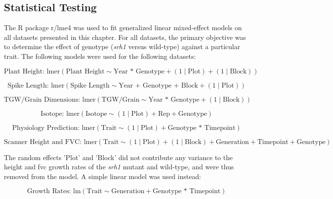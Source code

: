 \documentclass{article}
\begin{document}
\subsection{Statistical Testing}
The R package r/lme4 was used to fit generalized linear mixed-effect models
on all datasets presented in this chapter. For all datasets, the primary
objective was to determine the effect of genotype (\textit{srh1} versus wild-type)
against a particular trait. The following models were used for the following
datasets:

\begin{equation}
	\text{Plant Height: }\text{lmer}\left( \text{Plant Height}\sim \text{Year
		* Genotype}+ (1 \mid \text{Plot}) + (1 \mid \text{Block})\right)
\end{equation}

\begin{equation}
	\text{Spike Length: }\text{lmer}\left( \text{Spike Length}\sim \text{Year
		+ Genotype + Block}+ (1 \mid \text{Plot})\right)
\end{equation}

\begin{equation}
	\text{TGW/Grain Dimensions: }\text{lmer}\left( \text{TGW/Grain}\sim \text{Year
		* Genotype}+ (1 \mid \text{Block})\right)
\end{equation}

\begin{equation}
	\text{Isotope: }\text{lmer}\left( \text{Isotope}\sim (1 \mid \text{Plot})
	+ \text{Rep}+ \text{Genotype}\right)
\end{equation}

\begin{equation}
	\text{Physiology Prediction: }\text{lmer}\left( \text{Trait}\sim (1 \mid
		\text{Plot}) + \text{Genotype * Timepoint}\right)
\end{equation}

\begin{equation}
	\text{Scanner Height and FVC: }\text{lmer}\left( \text{Trait}\sim (1 \mid
	\text{Plot}) + (1 \mid \text{Block}) + \text{Generation}+ \text{Timepoint}
	+ \text{Genotype}\right)
\end{equation}

The random effects 'Plot' and 'Block' did not contribute any variance to the
height and fvc growth rates of the \textit{srh1} mutant and wild-type, and
were thus removed from the model. A simple linear model was used instead:

\begin{equation}
	\text{Growth Rates: }\text{lm}\left( \text{Trait}\sim \text{Generation}+
	\text{Genotype * Timepoint}\right)
\end{equation}
\end{document}
